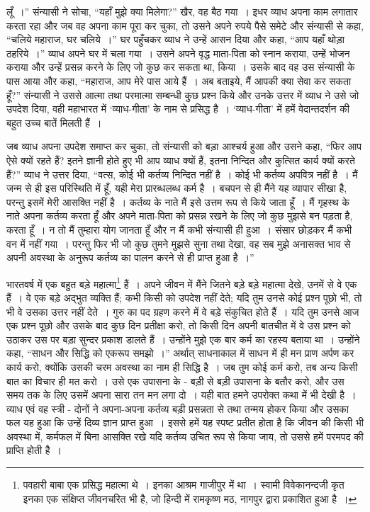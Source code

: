 लूँ~।” संन्यासी ने सोचा, “यहाँ मुझे क्या मिलेगा?” खैर, वह बैठ गया~। इधर व्याध अपना काम लगातार करता रहा और जब वह अपना काम पूरा कर चुका, तो उसने अपने रुपये पैसे समेटे और संन्यासी से कहा, “चलिये महाराज, घर चलिये~।” घर पहुँचकर व्याध ने उन्हें आसन दिया और कहा, “आप यहाँ थोड़ा ठहरिये~।” व्याध अपने घर में चला गया~। उसने अपने वृद्ध माता-पिता को स्नान कराया, उन्हें भोजन कराया और उन्हें प्रसन्न करने के लिए जो कुछ कर सकता था, किया~। उसके बाद वह उस संन्यासी के पास आया और कहा, “महाराज, आप मेरे पास आये हैं~। अब बताइये, मैं आपकी क्या सेवा कर सकता हूँ?” संन्यासी ने उससे आत्मा तथा परमात्मा सम्बन्धी कुछ प्रश्न किये और उनके उत्तर में व्याध ने उसे जो उपदेश दिया, वही महाभारत में ‘व्याध-गीता’ के नाम से प्रसिद्ध है~। ‘व्याध-गीता’ में हमें वेदान्तदर्शन की बहुत उच्च बातें मिलती हैं~।

जब व्याध अपना उपदेश समाप्त कर चुका, तो संन्यासी को बड़ा आश्चर्य हुआ और उसने कहा, “फिर आप ऐसे क्यों रहते हैं? इतने ज्ञानी होते हुए भी आप व्याध क्यों हैं, इतना निन्दित और कुत्सित कार्य क्यों करते हैं?” व्याध ने उत्तर दिया, “वत्स, कोई भी कर्तव्य निन्दित नहीं है~। कोई भी कर्तव्य अपवित्र नहीं है~। मैं जन्म से ही इस परिस्थिति में हूँ, यही मेरा प्रारब्धलब्ध कर्म है~। बचपन से ही मैंने यह व्यापार सीखा है, परन्तु इसमें मेरी आसक्ति नहीं है~। कर्तव्य के नाते मैं इसे उत्तम रूप से किये जाता हूँ~। मैं गृहस्थ के नाते अपना कर्तव्य करता हूँ और अपने माता-पिता को प्रसन्न रखने के लिए जो कुछ मुझसे बन पड़ता है, करता हूँ~। न तो मैं तुम्हारा योग जानता हूँ और न मैं कभी संन्यासी ही हुआ~। संसार छोड़कर मैं कभी वन में नहीं गया~। परन्तु फिर भी जो कुछ तुमने मुझसे सुना तथा देखा, वह सब मुझे अनासक्त भाव से अपनी अवस्था के अनुरूप कर्तव्य का पालन करने से ही प्राप्त हुआ है~।”

भारतवर्ष में एक बहुत बड़े महात्मा\footnote{पवहारी बाबा एक प्रसिद्ध महात्मा थे~। इनका आश्रम गाजीपुर में था~। स्वामी विवेकानन्दजी कृत इनका एक संक्षिप्त जीवनचरित भी है, जो हिन्दी में रामकृष्ण मठ, नागपुर द्वारा प्रकाशित हुआ है~।} हैं~। अपने जीवन में मैंने जितने बड़े बड़े महात्मा देखे, उनमें से वे एक हैं~। वे एक बड़े अद्भुत व्यक्ति हैं; कभी किसी को उपदेश नहीं देते; यदि तुम उनसे कोई प्रश्न पूछो भी, तो भी वे उसका उत्तर नहीं देते~। गुरु का पद ग्रहण करने में वे बड़े संकुचित होते हैं~। यदि तुम उनसे आज एक प्रश्न पूछो और उसके बाद कुछ दिन प्रतीक्षा करो, तो किसी दिन अपनी बातचीत में वे उस प्रश्न को उठाकर उस पर बड़ा सुन्दर प्रकाश डालते हैं~। उन्होंने मुझे एक बार कर्म का रहस्य बताया था~। उन्होंने कहा, “साधन और सिद्धि को एकरूप समझो~।” अर्थात् साधनाकाल में साधन में ही मन प्राण अर्पण कर कार्य करो, क्योंकि उसकी चरम अवस्था का नाम ही सिद्धि है~। जब तुम कोई कर्म करो, तब अन्य किसी बात का विचार ही मत करो~। उसे एक उपासना के - बड़ी से बड़ी उपासना के बतौर करो, और उस समय तक के लिए उसमें अपना सारा तन मन लगा दो~। यही बात हमने उपरोक्त कथा में भी देखी है~। व्याध एवं वह स्त्री - दोनों ने अपना-अपना कर्तव्य बड़ी प्रसन्नता से तथा तन्मय होकर किया और उसका फल यह हुआ कि उन्हें दिव्य ज्ञान प्राप्त हुआ~। इससे हमें यह स्पष्ट प्रतीत होता है कि जीवन की किसी भी अवस्था में, कर्मफल में बिना आसक्ति रखे यदि कर्तव्य उचित रूप से किया जाय, तो उससे हमें परमपद की प्राप्ति होती है~।

